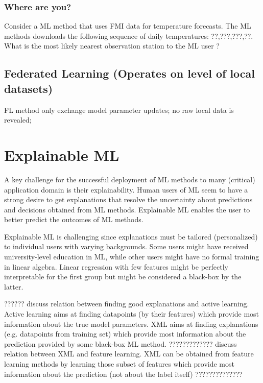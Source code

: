 \documentclass[12pt]{report}
\begin{document}
\subsection{Where are you?} 
\label{ex_where_are_you} 
Consider a ML method that uses FMI data for temperature forecasts. 
The ML methods downloads the following sequence of daily temperatures: ??,???,???,??. 
What is the most likely  nearest observation station to the ML user ? 



\section{Federated Learning (Operates on level of local datasets)}
FL method only exchange model parameter updates; no raw local data is revealed; 

 
\chapter{Explainable ML}
\label{chap_explainable_ML}

A key challenge for the successful deployment of ML methods to 
many (critical) application domain is their explainability. Human users 
of ML seem to have a strong desire to get explanations that resolve 
the uncertainty about predictions and decisions obtained from ML 
methods. Explainable ML enables the user to better predict the 
outcomes of ML methods. 

Explainable ML is challenging since explanations must be tailored 
(personalized) to individual users with varying backgrounds. Some 
users might have received university-level education in ML, while 
other users might have no formal training in linear algebra. Linear 
regression with few features might be perfectly interpretable for 
the first group but might be considered a black-box by the latter. 


?????? 
discuss relation between finding good explanations and active 
learning. Active learning aims at finding datapoints (by their features) 
which provide most information about the true model parameters. 
XML aims at finding explanations (e.g. datapoints from training set) 
which provide most information about the prediction provided by 
some black-box ML method. 
?????????????
discuss relation between XML and feature learning. XML can be 
obtained from feature learning methods by learning those subset 
of features which provide most information about the prediction 
(not about the label itself)
?????????????? 
\end{document}
